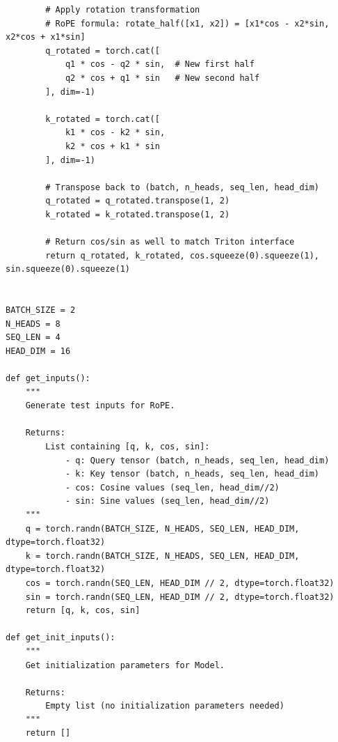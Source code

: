 \begin{mdframed}[linewidth=1pt, linecolor=black, backgroundcolor=gray!5]
\begin{lstlisting}
        # Apply rotation transformation
        # RoPE formula: rotate_half([x1, x2]) = [x1*cos - x2*sin, x2*cos + x1*sin]
        q_rotated = torch.cat([
            q1 * cos - q2 * sin,  # New first half
            q2 * cos + q1 * sin   # New second half
        ], dim=-1)

        k_rotated = torch.cat([
            k1 * cos - k2 * sin,
            k2 * cos + k1 * sin
        ], dim=-1)

        # Transpose back to (batch, n_heads, seq_len, head_dim)
        q_rotated = q_rotated.transpose(1, 2)
        k_rotated = k_rotated.transpose(1, 2)

        # Return cos/sin as well to match Triton interface
        return q_rotated, k_rotated, cos.squeeze(0).squeeze(1), sin.squeeze(0).squeeze(1)


BATCH_SIZE = 2
N_HEADS = 8
SEQ_LEN = 4
HEAD_DIM = 16

def get_inputs():
    """
    Generate test inputs for RoPE.

    Returns:
        List containing [q, k, cos, sin]:
            - q: Query tensor (batch, n_heads, seq_len, head_dim)
            - k: Key tensor (batch, n_heads, seq_len, head_dim)
            - cos: Cosine values (seq_len, head_dim//2)
            - sin: Sine values (seq_len, head_dim//2)
    """
    q = torch.randn(BATCH_SIZE, N_HEADS, SEQ_LEN, HEAD_DIM, dtype=torch.float32)
    k = torch.randn(BATCH_SIZE, N_HEADS, SEQ_LEN, HEAD_DIM, dtype=torch.float32)
    cos = torch.randn(SEQ_LEN, HEAD_DIM // 2, dtype=torch.float32)
    sin = torch.randn(SEQ_LEN, HEAD_DIM // 2, dtype=torch.float32)
    return [q, k, cos, sin]

def get_init_inputs():
    """
    Get initialization parameters for Model.

    Returns:
        Empty list (no initialization parameters needed)
    """
    return []
\end{lstlisting}
\end{mdframed}

